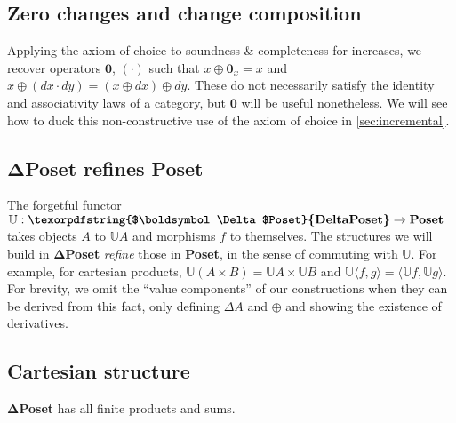 \documentclass{rntz}\usepackage[a5]{rntzgeometry}\usepackage[fullwidth=130mm,width=330pt,]{narrow}
\newcommand\mathvar[1]{\ensuremath{#1}} %
\renewcommand\mathvar[1]{\ensuremath{\mathit{#1}}} %
\newcommand\cat\textbf
\newcommand\CP{\cat{\texorpdfstring{$\boldsymbol\Delta$Poset}{DeltaPoset}}}
\newcommand\Poset{\cat{Poset}}
\newcommand\D\Delta
\newcommand\x\times
\newcommand\zero{\ensuremath{\mathbold{0}}}
\newcommand\<{\mskip 4mu plus 4mu minus 1mu}
\newcommand\dx{\mathvar{dx}}
\newcommand\dy{\mathvar{dy}}
\newcommand\valfn{\ensuremath{\mathbb{U}}}
\newcommand\vals{\valfn}
\newcommand\chgs[1]{\D{#1}}
\newcommand\upd{\mathbin{\oplus}}
\newcommand\fork[1]{\langle{#1}\rangle}
\begin{document}

\subsection{Zero changes and change composition}

Applying the axiom of choice to soundness \& completeness for increases, we
recover operators $\zero$, $(\cdot)$ such that $x \upd \zero_x = x$ and $x \upd
(\dx \cdot \dy) = (x \upd \dx) \upd \dy$. These do not necessarily satisfy the
identity and associativity laws of a category, but $\zero$ will be useful
nonetheless. We will see how to duck this non-constructive use of the axiom of
choice in \cref{sec:incremental}.


\subsection{\CP{} refines \Poset{}}
\label{sec:refines}

The forgetful functor $\valfn : \CP \to \Poset$ takes objects $A$ to $\vals{A}$
and morphisms $f$ to themselves. The structures we will build in \CP{}
\emph{refine} those in \Poset{}, in the sense of commuting with $\valfn$. For
example, for cartesian products, $\vals{(A \x B)} = \vals{A} \x \vals{B}$ and
$\vals{\fork{f,g}} = \fork{\vals f, \vals g}$.
%
For brevity, we omit the ``value components'' of our constructions when they can
be derived from this fact, only defining $\chgs{A}$ and $\oplus$ and showing the
existence of derivatives.


\subsection{Cartesian structure}

\begin{theorem}
  \CP{} has all finite products and sums.
\end{theorem}
\end{document}
